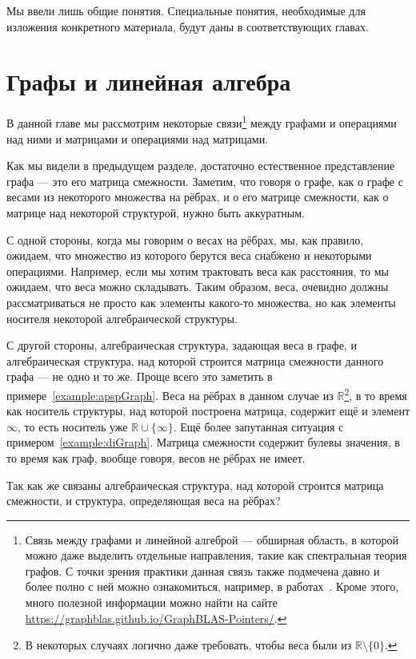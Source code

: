 Мы ввели лишь общие понятия.
Специальные понятия, необходимые для изложения конкретного материала, будут даны в соответствующих главах.

\section{Графы и линейная алгебра}

В данной главе мы рассмотрим некоторые связи\footnote{Связь между графами и линейной алгеброй --- обширная область, в которой можно даже выделить отдельные направления, такие как спектральная теория графов. С точки зрения практики данная связь также подмечена давно и более полно с ней можно ознакомиться, например, в работах~\cite{doi:10.1137/1.9780898719918, Davis2018Algorithm9S}. Кроме этого, много полезной информации можно найти на сайте \url{https://graphblas.github.io/GraphBLAS-Pointers/}.} между графами и операциями над ними и матрицами и операциями над матрицами. 

Как мы видели в предыдущем разделе, достаточно естественное представление графа --- это его матрица смежности. Заметим, что говоря о графе, как о графе с весами из некоторого множества на рёбрах, и о его матрице смежности, как о матрице над некоторой структурой, нужно быть аккуратным.

С одной стороны, когда мы говорим о весах на рёбрах, мы, как правило, ожидаем, что множество из которого берутся веса снабжено и некоторыми операциями. Например, если мы хотим трактовать веса как расстояния, то мы ожидаем, что веса можно складывать. Таким образом, веса, очевидно должны рассматриваться не просто как элементы какого-то множества, но как элементы носителя некоторой алгебраической структуры. 

С другой стороны, алгебраическая структура, задающая веса в графе, и алгебраическая структура, над которой строится матрица смежности данного графа --- не одно и то же. Проще всего это заметить в примере~\ref{example:apspGraph}. Веса на рёбрах в данном случае из $\mathbb{R}$\footnote{В некоторых случаях логично даже требовать, чтобы веса были из $\mathbb{R} \setminus \{0\}$.}, в то время как носитель структуры, над которой построена матрица, содержит ещё и элемент $\infty$, то есть носитель уже $\mathbb{R}\cup\{\infty\}$. Ещё более запутанная ситуация с примером~\ref{example:diGraph}. Матрица смежности содержит булевы значения, в то время как граф, вообще говоря, весов не рёбрах не имеет.

Так как же связаны алгебраическая структура, над которой строится матрица смежности, и структура, определяющая веса на рёбрах? 

